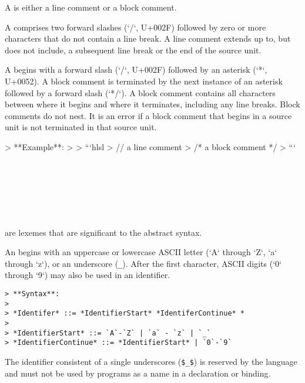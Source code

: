 
A  is either a line comment or a block comment.

A  comprises two forward slashes (`/`, U+002F) followed by zero or more characters that do not contain a line break.
A line comment extends up to, but does not include, a subsequent line break or the end of the source unit.

A  begins with a forward slash (`/`, U+002F) followed by an asterisk (`*`, U+0052). 
A block comment is terminated by the next instance of an asterisk followed by a forward slash (`*/`).
A block comment contains all characters between where it begins and where it terminates, including any line breaks.
Block comments do not nest.
It is an error if a block comment that begins in a source unit is not terminated in that source unit.

> **Example**:
>
> ```hlsl
> // a line comment
> /* a block comment */
> ```


\begin{Lexical}
     \\
         \\
    \SynOr {} \\
    \SynOr {} \\
    \SynOr {} \\
\end{Lexical}

 are lexemes that are significant to the abstract syntax.


An  begins with an uppercase or lowercase ASCII letter (`A` through `Z`, `a` through `z`), or an underscore (\lstinline{_}).
After the first character, ASCII digits (`0` through `9`) may also be used in an identifier.

\begin{verbatim}
> **Syntax**:
>
> *Identifer* ::= *IdentifierStart* *IdentiferContinue* *
>
> *IdentifierStart* ::= `A`-`Z` | `a` - `z` | `_`
> *IdentifierContinue* ::= *IdentifierStart* | `0`-`9`        
\end{verbatim}

The identifier consistent of a single underscores (\lstinline|$_$|) is reserved by the language and must not be used by programs as a name in a declaration or binding.


